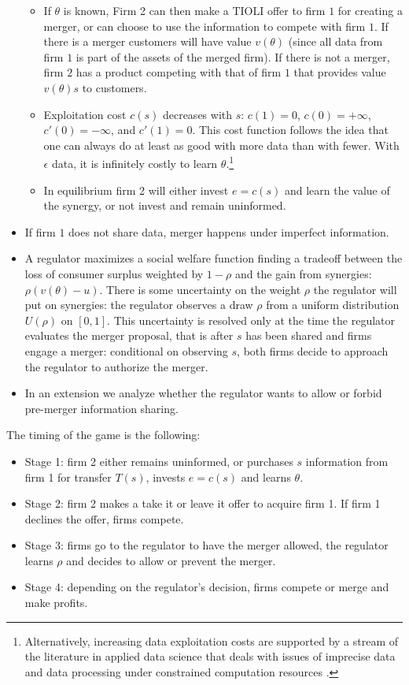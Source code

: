 \documentclass[a4paper,leqno]{article}%
\renewcommand{\t}{\theta}
\begin{document}
\begin{itemize}
\begin{itemize}
        \item If $\t$ is known, Firm 2 can then make a TIOLI offer to firm $1$ for creating a merger, or can choose to use the information to compete with firm $1$. If there is a merger customers will have value $v(\t)$ (since all data from firm $1$ is part of the assets of the merged firm). If there is not a merger, firm $2$ has a product competing with that of firm $1$ that provides value $v(\t)s$ to customers.
        \item Exploitation cost $c(s)$ decreases with $s$: $c(1)=0$, $c(0)=+\infty$, $c'(0)=-\infty$, and $c'(1)=0$. This cost function follows the idea that one can always do at least as good with more data than with fewer. With $\epsilon$ data, it is infinitely costly to learn $\t$.\footnote{Alternatively, increasing data exploitation costs are supported by a stream of the literature in applied data science that deals with issues of imprecise data and data processing under constrained computation resources \citep{hernandez1995merge}.}
        \item In equilibrium firm 2 will either invest $e=c(s)$ and learn the value of the synergy, or not invest and remain uninformed.
    \end{itemize}
    \item If firm $1$ does not share data, merger happens under imperfect information.
    \item A regulator maximizes a social welfare function finding a tradeoff between the loss of consumer surplus weighted by $1-\rho$ and the gain from synergies: $\rho (v(\t)-u)$. There is some uncertainty on the weight $\rho$ the regulator will put on synergies: the regulator observes a draw $\rho$ from a uniform distribution $U(\rho)$ on $[0,1]$. This uncertainty is resolved only at the time the regulator evaluates the merger proposal, that is after $s$ has been shared and firms engage a merger: conditional on observing $s$, both firms decide to approach the regulator to authorize the merger.
    \item In an extension we analyze whether the regulator wants to allow or forbid pre-merger information sharing.
\medskip
\end{itemize}

The timing of the game is the following:


\begin{itemize}[label={--}]
    \item Stage 1: firm 2 either remains uninformed, or purchases $s$ information from firm 1 for transfer $T(s)$, invests $e=c(s)$ and learns $\t$.
    \item Stage 2: firm 2 makes a take it or leave it offer to acquire firm 1. If firm 1 declines the offer, firms compete.
    \item Stage 3: firms go to the regulator to have the merger allowed, the regulator learns $\rho$ and decides to allow or prevent the merger.
    \item Stage 4: depending on the regulator's decision, firms compete or merge and make profits.
\end{itemize}
\end{document}
